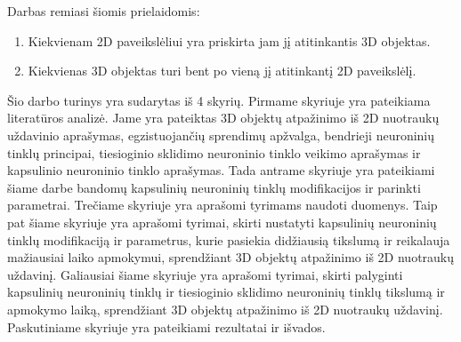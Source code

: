 Darbas remiasi šiomis prielaidomis:

\begin{enumerate}
	\item Kiekvienam 2D paveikslėliui yra priskirta jam jį atitinkantis 3D objektas.
	\item Kiekvienas 3D objektas turi bent po vieną jį atitinkantį 2D paveikslėlį.
\end{enumerate}

Šio darbo turinys yra sudarytas iš 4 skyrių. Pirmame skyriuje yra pateikiama literatūros analizė. Jame yra pateiktas 3D objektų atpažinimo iš 2D nuotraukų uždavinio aprašymas, egzistuojančių sprendimų apžvalga, bendrieji neuroninių tinklų principai, tiesioginio sklidimo neuroninio tinklo veikimo aprašymas ir kapsulinio neuroninio tinklo aprašymas.
Tada antrame skyriuje yra pateikiami šiame darbe bandomų kapsulinių neuroninių tinklų modifikacijos ir parinkti parametrai.
Trečiame skyriuje yra aprašomi tyrimams naudoti duomenys.
Taip pat šiame skyriuje yra aprašomi tyrimai, skirti nustatyti kapsulinių neuroninių tinklų modifikaciją ir parametrus, kurie pasiekia didžiausią tikslumą ir reikalauja mažiausiai laiko apmokymui, sprendžiant 3D objektų atpažinimo iš 2D nuotraukų uždavinį.
Galiausiai šiame skyriuje yra aprašomi tyrimai, skirti palyginti kapsulinių neuroninių tinklų ir tiesioginio sklidimo neuroninių tinklų tikslumą ir apmokymo laiką, sprendžiant 3D objektų atpažinimo iš 2D nuotraukų uždavinį.
Paskutiniame skyriuje yra pateikiami rezultatai ir išvados.

